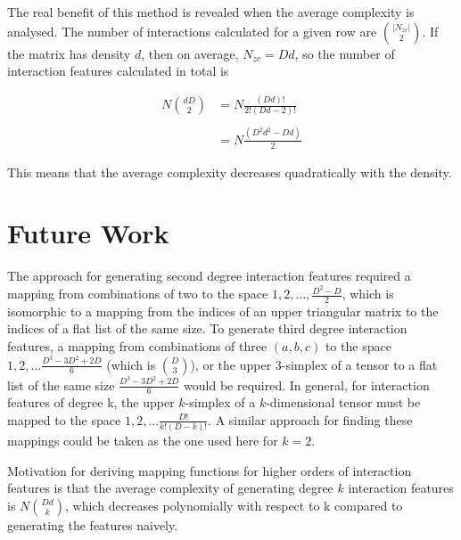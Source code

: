 \documentclass[11pt]{article}
\begin{document}
The real benefit of this method is revealed when the average complexity is analysed. The 
number of interactions calculated for a given row are $\binom{|N_{zc}|}{2}$. If the matrix has 
density $d$, then on average, $N_{zc} = D d$, so the number of interaction features 
calculated in total is 

\begin{align*}
N \binom{d D}{2} &= N \frac{(Dd)!}{2!(Dd-2)!}\\
    \\
    &= N \frac{(D^2d^2-Dd)}{2}
\end{align*}

This means that the average complexity decreases quadratically with the density.

\section{Future Work}
The approach for generating second degree interaction features required a mapping from 
combinations of two to the space $1,2,...,\frac{D^2-D}{2}$, which is isomorphic to a mapping from 
the indices of an upper triangular matrix to the indices of a flat list of the same size. 
To generate third degree interaction features, a mapping from combinations of three 
$(a,b,c)$ to the space $1,2,...\frac{D^3-3D^2+2D}{6}$ (which is $\binom{D}{3}$), or the upper $3$-simplex of a tensor to a flat 
list of the same size $\frac{D^3-3D^2+2D}{6}$ would be required. In general, for interaction 
features of degree k, the upper $k$-simplex of a $k$-dimensional tensor must be mapped to the 
space $1,2,...\frac{D!}{k!(D-k)!}$. A similar approach for finding these mappings could be taken 
as the one used here for $k=2$. 

Motivation for deriving mapping functions for higher orders
of interaction features is that the average complexity of generating degree $k$ interaction
features is $N \binom{Dd}{k}$, which decreases polynomially with respect to k compared to
generating the features naively.

    
\vskip 0.2in

\end{document}
